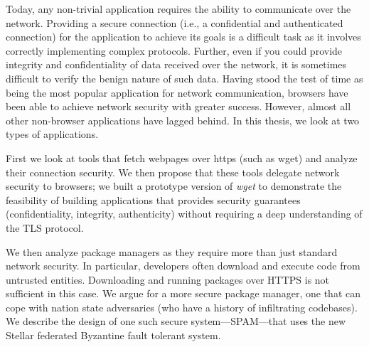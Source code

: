 Today, any non-trivial application requires the ability to communicate over the
network. Providing a secure connection (i.e., a confidential and authenticated
connection) for the application to achieve its goals is a difficult task as it
involves correctly implementing complex protocols. Further, even if you could
provide integrity and confidentiality of data received over the network, it is
sometimes difficult to verify the benign nature of such data. Having stood the
test of time as being the most popular application for network communication,
browsers have been able to achieve network security with greater success.
However, almost all other non-browser applications have lagged behind. In this
thesis, we look at two types of applications.

First we look at tools that fetch webpages over https (such as wget) and
analyze their connection security. We then propose that these tools delegate
network security to browsers; we built a prototype version of \emph{wget} to
demonstrate the feasibility of building applications that provides security
guarantees (confidentiality, integrity, authenticity) without requiring a deep
understanding of the TLS protocol.

We then analyze package managers as they require more than just standard
network security. In particular, developers often download and execute code
from untrusted entities. Downloading and running packages over HTTPS is not
sufficient in this case. We argue for a more secure package manager, one that
can cope with nation state adversaries (who have a history of infiltrating
codebases). We describe the design of one such secure system---SPAM---that uses
the new Stellar federated Byzantine fault tolerant system.
